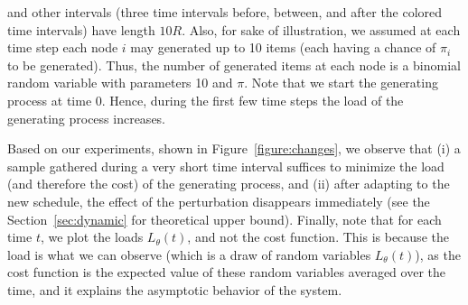 and other intervals (three time intervals before, between, and after the colored time intervals) have length $10R$. Also, for sake of illustration, we assumed at each time step each node $i$ may generated up to 10 items (each having a chance of $\pi_i$ to be generated). Thus, the number of generated items at each node is a binomial random variable with parameters 10 and $\pi$.
Note that we start the generating process at time 0. Hence, during the first few time steps the load of the generating process increases.

Based on our experiments, shown in Figure~\ref{figure:changes}, we observe that (i) a sample gathered during a very short time interval suffices to minimize the load (and therefore the cost) of the generating process, and (ii) after adapting to the new schedule, the effect of the perturbation disappears immediately (see the Section~\ref{sec:dynamic} for theoretical upper bound). Finally, note that for each time $t$, we plot the loads $L_\theta(t)$, and not the cost function. This is because the load is what we can observe (which is a draw of random variables $L_\theta(t)$), as the cost function is the expected value of these random variables averaged over the time, and it explains  the asymptotic behavior of the system.



